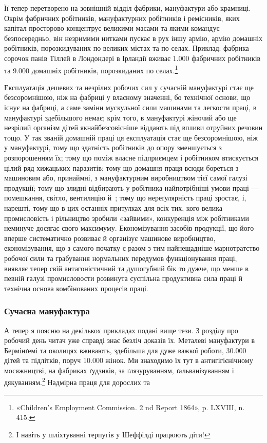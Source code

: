 \parcont{}  %
Її тепер перетворено на зовнішній відділ фабрики, мануфактури
або крамниці. Окрім фабричних робітників, мануфактурних робітників
і ремісників, яких капітал просторово концентрує великими
масами та якими командує безпосередньо, він незримими
нитками пускає в рух іншу армію, армію домашніх робітників,
порозкидуваних по великих містах та по селах. Приклад: фабрика
сорочок панів Тіллей в Лондондері в Ірландії вживає \num{1.000} фабричних
робітників та \num{9.000} домашніх робітників, порозкиданих по
селах.\footnote{
«Children’s Employment Commission. 2 nd Report 1864»,
p. LXVIII, n. 415.
}

Експлуатація дешевих та незрілих робочих сил у сучасній
мануфактурі стає ще безсоромнішою, ніж на фабриці у власному
значенні, бо технічної основи, що існує на фабриці, а саме заміни
мускульної сили машинами та легкости праці, в мануфактурі
здебільшого немає; крім того, в мануфактурі жіночий або ще
незрілий організм дітей якнайбезсовісніше віддають під впливи
отруйних речовин тощо. У так званій домашній праці ця експлуатація
стає ще безсоромнішою, ніж у мануфактурі, тому що здатність
робітників до опору зменшується з розпорошенням їх;
тому що поміж власне підприємцем і робітником втискується цілий
ряд хижацьких паразитів; тому що домашня праця всюди бореться
з машиновим або, принаймні, з мануфактурним виробництвом тієї
самої галузі продукції; тому що злидні відбирають у робітника
найпотрібніші умови праці — помешкання, світло, вентиляцію
й~; тому що нереґулярність праці зростає, і, нарешті, тому
що в цих останніх притулках для всіх тих, кого велика промисловість
і рільництво зробили «зайвими», конкуренція між робітниками
неминуче досягає свого максимуму. Економізування
засобів продукції, що його вперше систематично розвиває й
організує машинове виробництво, економізування, що з самого
початку є разом з тим найнещадніше марнотратство робочої
сили та грабування нормальних передумов функціонування праці,
виявляє тепер свій антагоністичний та душогубний бік то дужче,
що менше в певній галузі промисловости розвинута суспільна
продуктивна сила праці й технічна основа комбінованих процесів
праці.

\subsubsection{Сучасна мануфактура}

А тепер я поясню на декількох прикладах подані вище тези.
З розділу про робочий день читач уже справді знає безліч доказів
їх. Металеві мануфактури в Бермінґемі та околицях вживають,
здебільша для дуже важкої роботи, \num{30.000} дітей та підлітків,
поруч \num{10.000} жінок. Ми знаходимо їх тут в антигігієнічному
мосяжництві, на фабриках ґудзиків, за ґлязуруванням, ґальванізуванням
і дякуванням.\footnote{
І навіть у шліхтуванні терпугів у Шеффілді працюють діти!
} Надмірна праця для дорослих та
\parbreak{}  %
